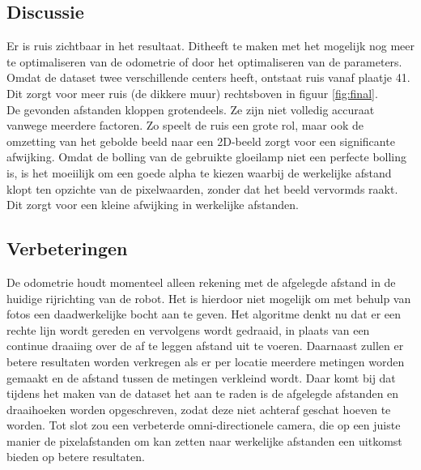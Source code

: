 \documentclass[a4paper]{article}
\begin{document}
\subsection{Discussie}
Er is ruis zichtbaar in het resultaat. Ditheeft te maken met het mogelijk nog meer te optimaliseren van de odometrie of door het optimaliseren van de parameters.
Omdat de dataset twee verschillende centers heeft, ontstaat ruis vanaf plaatje 41. Dit zorgt voor meer ruis (de dikkere muur) rechtsboven in figuur \ref{fig:final}.\\
De gevonden afstanden kloppen grotendeels. Ze zijn niet volledig accuraat vanwege meerdere factoren. Zo speelt de ruis een grote rol, maar ook de omzetting van het gebolde beeld naar een 2D-beeld zorgt voor een significante afwijking. Omdat de bolling van de gebruikte gloeilamp niet een perfecte bolling is, is het moeiilijk om een goede alpha te kiezen waarbij de werkelijke afstand klopt ten opzichte van de pixelwaarden, zonder dat het beeld vervormds raakt. Dit zorgt voor een kleine afwijking in werkelijke afstanden.
\subsection{Verbeteringen}
De odometrie houdt momenteel alleen rekening met de afgelegde afstand in de huidige rijrichting van de robot. Het is hierdoor niet mogelijk om met behulp van fotos een daadwerkelijke bocht aan te geven. Het algoritme denkt nu dat er een rechte lijn wordt gereden en vervolgens wordt gedraaid, in plaats van een continue draaiing over de af te leggen afstand uit te voeren. Daarnaast zullen er betere resultaten worden verkregen als er per locatie meerdere metingen worden gemaakt en de afstand tussen de metingen verkleind wordt. Daar komt bij dat tijdens het maken van de dataset het aan te raden is de afgelegde afstanden en draaihoeken worden opgeschreven, zodat deze niet achteraf geschat hoeven te worden. Tot slot zou een verbeterde omni-directionele camera, die op een juiste manier de pixelafstanden om kan zetten naar werkelijke afstanden een uitkomst bieden op betere resultaten.
\end{document}
